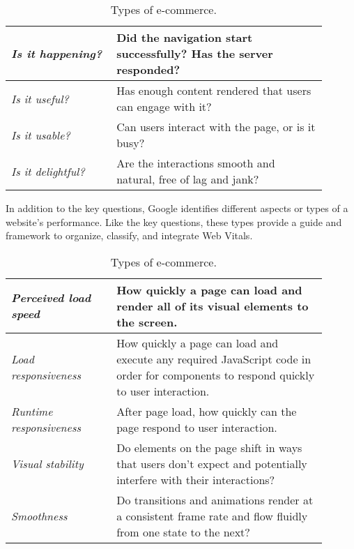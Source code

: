 \begin{table}[h]
	\small
	\centering
	\begin{tabular}{ p{0.3\linewidth} | p{0.6\linewidth} }
	\textit{Is it happening?} & Did the navigation start successfully? Has the server responded? \\
	\hline
	\textit{Is it useful?} & Has enough content rendered that users can engage with it? \\
	\hline
	\textit{Is it usable?} & Can users interact with the page, or is it busy? \\
	\hline
	\textit{Is it delightful?} & Are the interactions smooth and natural, free of lag and jank? \\
	\end{tabular}
	\medskip
	\caption{Types of e-commerce.}
	\label{table:types_ecommerce}
\end{table}



In addition to the key questions, Google identifies different aspects or types of a website's performance.
Like the key questions, these types provide a guide and framework to organize, classify, and integrate Web Vitals. %


\begin{table}[h]
	\small
	\centering
	\begin{tabular}{ p{0.3\linewidth} | p{0.6\linewidth} }
	\textit{Perceived load speed} & How quickly a page can load and render all of its visual elements to the screen. \\
	\hline
	\textit{Load responsiveness} & How quickly a page can load and execute any required JavaScript code in order for components to respond quickly to user interaction. \\
	\hline
	\textit{Runtime responsiveness} & After page load, how quickly can the page respond to user interaction. \\
	\hline
	\textit{Visual stability} & Do elements on the page shift in ways that users don't expect and potentially interfere with their interactions? \\
	\hline
	\textit{Smoothness} & Do transitions and animations render at a consistent frame rate and flow fluidly from one state to the next? \\
	\end{tabular}
	\medskip
	\caption{Types of e-commerce.}
	\label{table:types_ecommerce}
\end{table}



